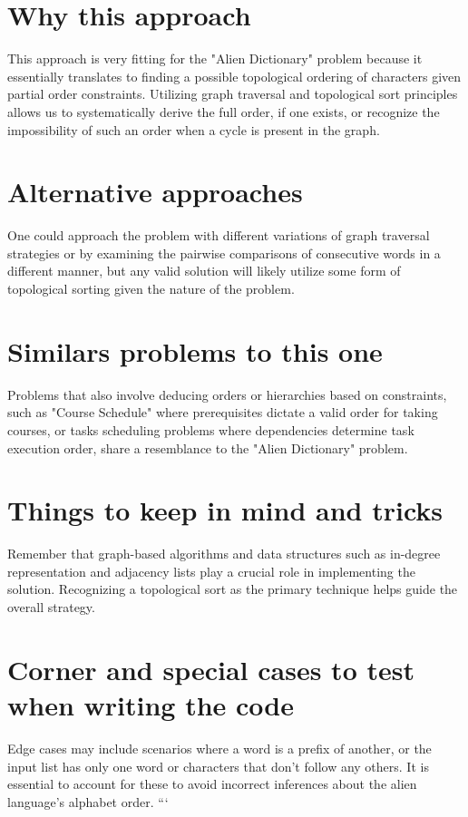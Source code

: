\section*{Why this approach}
This approach is very fitting for the "Alien Dictionary" problem because it essentially translates to finding a possible topological ordering of characters given partial order constraints. Utilizing graph traversal and topological sort principles allows us to systematically derive the full order, if one exists, or recognize the impossibility of such an order when a cycle is present in the graph.

\section*{Alternative approaches}
One could approach the problem with different variations of graph traversal strategies or by examining the pairwise comparisons of consecutive words in a different manner, but any valid solution will likely utilize some form of topological sorting given the nature of the problem.

\section*{Similars problems to this one}
Problems that also involve deducing orders or hierarchies based on constraints, such as "Course Schedule" where prerequisites dictate a valid order for taking courses, or tasks scheduling problems where dependencies determine task execution order, share a resemblance to the "Alien Dictionary" problem.

\section*{Things to keep in mind and tricks}
Remember that graph-based algorithms and data structures such as in-degree representation and adjacency lists play a crucial role in implementing the solution. Recognizing a topological sort as the primary technique helps guide the overall strategy.

\section*{Corner and special cases to test when writing the code}
Edge cases may include scenarios where a word is a prefix of another, or the input list has only one word or characters that don't follow any others. It is essential to account for these to avoid incorrect inferences about the alien language's alphabet order.
```